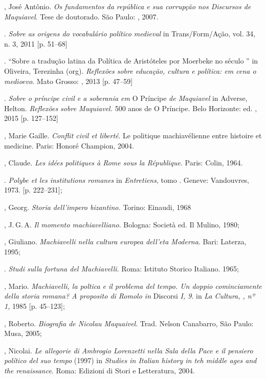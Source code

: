\begin{bibliohedra}
, José Antônio. \emph{Os fundamentos da república e sua corrupção
nos Discursos de Maquiavel}. Tese de doutorado. São Paulo: ,
2007.

\titidem. \emph{Sobre as origens do vocabulário político
medieval} in Trans/Form/Ação, vol. 34, n. 3, 2011 {[}p. 51--68{]}

\titidem. ``Sobre a tradução latina da Política de Aristóteles por Moerbeke no século '' in Oliveira, Terezinha (org). \emph{Reflexões sobre educação, cultura e política: em cena o medioevo}. Mato Grosso: , 2013 {[}p. 47--59{]}

\titidem. \emph{Sobre o príncipe civil e a soberania em} O
Príncipe \emph{de Maquiavel} in Adverse, Helton. \emph{Reflexões sobre
Maquiavel.} 500 anos de O Príncipe. Belo Horizonte: ed. , 2015 {[}p.
127--152{]}

, Marie Gaille. \emph{Conflit civil et liberté}. Le politique
machiavélienne entre histoire et medicine. Paris: Honoré Champion, 2004.

, Claude. \emph{Les idées politiques à Rome sous la République}.
Paris: Colin, 1964.

\titidem. \emph{Polybe et les institutions romanes} in
\emph{Entretiens}, tomo . Geneve: Vandouvres, 1973. {[}p. 222--231{]};

, Georg. \emph{Storia dell'impero bizantino.} Torino: Einaudi,
1968

, J.\,G.\,A. \emph{Il momento machiavelliano}. Bologna: Società ed.
Il Mulino, 1980;

, Giuliano. \emph{Machiavelli nella cultura europea dell'eta
Moderna}. Bari: Laterza, 1995;

\titidem. \emph{Studi sulla fortuna del Machiavelli}. Roma:
Istituto Storico Italiano. 1965;

, Mario. \emph{Machiavelli, la poltica e il problema del tempo. Un
doppio cominciamente della storia romana? A proposito di Romolo in}
Discorsi \emph{I, 9}. in \emph{La Cultura, , nº 1,} 1985 {[}p.
45--123{]};

, Roberto. \emph{Biografia de Nicolau Maquaivel}. Trad. Nelson
Canabarro, São Paulo: Musa, 2005;

, Nicolai. \emph{Le allegorie di Ambrogio Lorenzetti nella
Sala della Pace e il pensiero político del suo tempo} (1997) in
\emph{Studies in Italian history in teh middle ages and the
renaissance}. Roma: Edizioni di Stori e Letteratura, 2004.


\end{bibliohedra}
